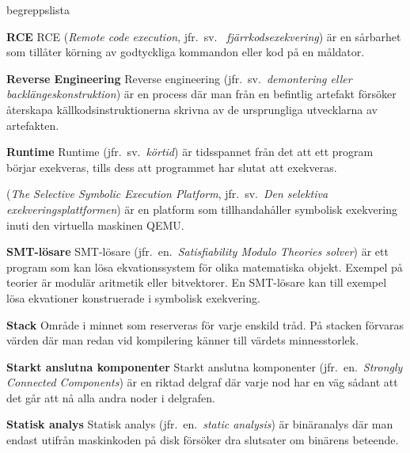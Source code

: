 \begin{labeling}{begreppslista}
    \item [\textbf{RCE}] RCE (\emph{Remote code execution}, jfr.\ sv.
    \ \emph{fjärrkodsexekvering}) är en sårbarhet som tillåter körning av
    godtyckliga kommandon eller kod på en måldator.

    \item [\textbf{Reverse Engineering}] Reverse engineering (jfr.\ sv.\ \emph{demontering eller
        backlängeskonstruktion}) är en process där man från en
    befintlig artefakt försöker återskapa källkodsinstruktionerna
    skrivna av de ursprungliga utvecklarna av artefakten.

    \item [\textbf{Runtime}] Runtime (jfr.\ sv.\ \emph{körtid}) är tidsspannet
    från det att ett program börjar exekveras, tills dess att programmet har
    slutat att exekveras.

    \item [\textbf{\stoe}] \stoe (\emph{The Selective Symbolic Execution
        Platform}, jfr.\ sv.\ \emph{Den selektiva exekveringsplattformen}) är
    en platform som tillhandahåller symbolisk exekvering inuti den virtuella
    maskinen QEMU.\@

    \item [\textbf{SMT-lösare}] SMT-lösare (jfr.\ en.\ \emph{Satisfiability Modulo
        Theories solver}) är ett program som kan lösa
    ekvationssystem för olika matematiska objekt. Exempel på
    teorier är modulär aritmetik eller bitvektorer. En SMT-lösare
    kan till exempel lösa ekvationer konstruerade i symbolisk
    exekvering.

    \item [\textbf{Stack}] Område i minnet som reserveras för varje
    enskild tråd.  På stacken förvaras värden där man redan vid
    kompilering känner till värdets minnesstorlek.

    \item [\textbf{Starkt anslutna komponenter}] Starkt anslutna komponenter (jfr.\ en.\ \emph{Strongly
        Connected Components}) är en riktad delgraf där varje nod har en
    väg sådant att det går att nå alla andra noder i delgrafen.

    \item [\textbf{Statisk analys}] Statisk analys (jfr.\ en.\ \emph{static
        analysis}) är binäranalys där man endast utifrån maskinkoden på disk
    försöker dra slutsater om binärens beteende.



\end{labeling}
